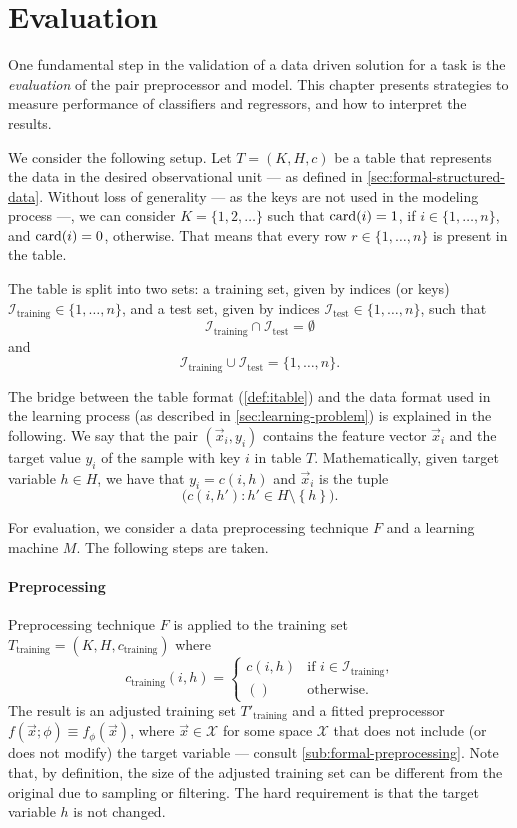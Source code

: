 \section{Evaluation}
\label{sec:evaluation}

One fundamental step in the validation of a data driven solution for a task is the
\emph{evaluation} of the pair preprocessor and model. This chapter presents strategies to
measure performance of
classifiers and regressors, and how to interpret the results.

We consider the following setup.  Let $T = (K, H, c)$ be a table that represents the data
in the desired observational unit --- as defined in \cref{sec:formal-structured-data}.
Without loss of generality --- as the keys are not used in the modeling process ---, we
can consider $K = \{1, 2, \dots\}$ such that $\rowcard[i] = 1$, if $i \in \{1, \dots,
n\}$, and $\rowcard[i] = 0$, otherwise.  That means that every row $r \in \{1, \dots, n\}$
is present in the table.

The table is split into two sets: a training set, given by indices (or keys)
$\mathcal{I}_\text{training} \in \{1, \dots, n\}$, and a test set, given by indices
$\mathcal{I}_\text{test} \in \{1, \dots, n\}$, such that $$\mathcal{I}_\text{training}
\cap \mathcal{I}_\text{test} = \emptyset$$ and $$\mathcal{I}_\text{training} \cup
\mathcal{I}_\text{test} = \{1,\dots,n\}\text{.}$$

The bridge between the table format (\cref{def:itable}) and the data format used in the
learning process (as described in \cref{sec:learning-problem}) is explained in the
following.  We say that the pair $(\vec{x}_i, y_i)$ contains the feature vector $\vec{x}_i$
and the target value $y_i$ of the sample with key $i$ in table $T$.  Mathematically,
given target variable $h \in H$, we have that $y_i = c(i, h)$ and $\vec{x}_i$ is the tuple
$$\big(c(i, h') : h' \in H \setminus \left\{ h \right\}\big)\text{.}$$

For evaluation, we consider a data preprocessing technique $F$ and a learning machine
$M$.  The following steps are taken.

\paragraph{Preprocessing}

Preprocessing technique $F$ is applied to the training set $T_\text{training} = (K, H,
c_\text{training})$ where \[
  c_\text{training}(i, h) = \begin{cases}
    c(i, h) & \text{if } i \in \mathcal{I}_\text{training}\text{,} \\
    () & \text{otherwise}\text{.}
  \end{cases}
\]  The result is an adjusted training set $T'_\text{training}$ and a fitted
preprocessor $f(\vec{x}; \phi) \equiv f_\phi(\vec{x})$, where $\vec{x} \in \mathcal{X}$
for some space $\mathcal{X}$ that does not include (or does not modify) the target
variable --- consult \cref{sub:formal-preprocessing}.  Note that, by definition, the size
of the adjusted training set can be different from the original due to sampling or
filtering.  The hard requirement is that the target variable $h$ is not changed.

